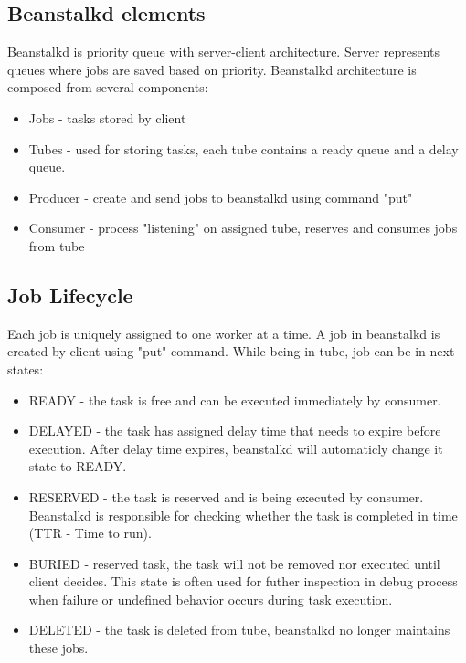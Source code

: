     \subsection{Beanstalkd elements}
    Beanstalkd is priority queue with server-client architecture. Server represents queues where jobs are saved based on priority. Beanstalkd architecture is composed from several components:
    \begin{itemize}
        \item Jobs - tasks stored by client
        \item Tubes - used for storing tasks, each tube contains a ready queue and a delay queue.
        \item Producer - create and send jobs to beanstalkd using command "put"
        \item Consumer - process "listening" on assigned tube, reserves and consumes jobs from tube
    \end{itemize}

    \subsection{Job Lifecycle}
    Each job is uniquely assigned to one worker at a time. A job in beanstalkd is created by client using "put" command. While being in tube, job can be in next states\cite{beanstalkdProtocol}:
    \begin{itemize}
        \item READY - the task is free and can be executed immediately by consumer.
        \item DELAYED - the task has assigned delay time that needs to expire before execution. After delay time expires, beanstalkd will automaticly change it state to READY.
        \item RESERVED - the task is reserved and is being executed by consumer. Beanstalkd is responsible for checking whether the task is completed in time (TTR - Time to run).
        \item BURIED - reserved task, the task will not be removed nor executed until client decides. This state is often used for futher inspection in debug process when failure or undefined behavior occurs during task execution.
        \item DELETED - the task is deleted from tube, beanstalkd no longer maintains these jobs.
    \end{itemize}

